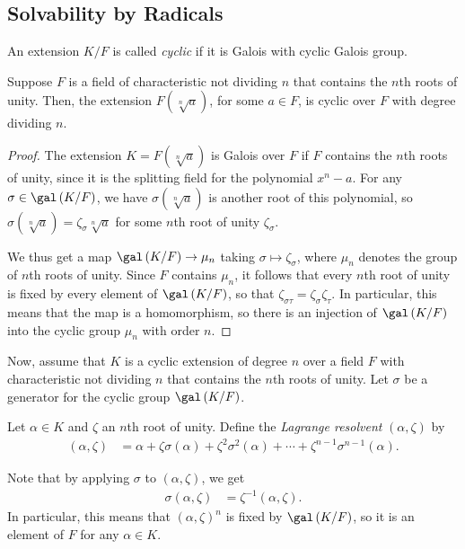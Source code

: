\documentclass[10pt]{mypackage}
\begin{document}
\subsection{Solvability by Radicals}%
\begin{definition}
  An extension $K/F$ is called \textit{cyclic} if it is Galois with cyclic Galois group.
\end{definition}
\begin{proposition}
  Suppose $F$ is a field of characteristic not dividing $n$ that contains the $n$th roots of unity. Then, the extension $F\left( \sqrt[n]{a} \right)$, for some $a\in F$, is cyclic over $F$ with degree dividing $n$.
\end{proposition}
\begin{proof}
  The extension $K = F\left( \sqrt[n]{a} \right)$ is Galois over $F$ if $F$ contains the $n$th roots of unity, since it is the splitting field for the polynomial $x^{n}-a$. For any $\sigma\in \gal\left( K/F \right)$, we have $\sigma\left( \sqrt[n]{a} \right)$ is another root of this polynomial, so $\sigma\left( \sqrt[n]{a} \right) = \zeta_{\sigma}\sqrt[n]{a}$ for some $n$th root of unity $\zeta_{\sigma}$.

  We thus get a map $\gal\left( K/F \right)\rightarrow \mu_n$ taking $\sigma\mapsto \zeta_{\sigma}$, where $\mu_n$ denotes the group of $n$th roots of unity. Since $F$ contains $\mu_n$, it follows that every $n$th root of unity is fixed by every element of $\gal\left( K/F \right)$, so that $\zeta_{\sigma\tau} = \zeta_{\sigma}\zeta_{\tau}$. In particular, this means that the map is a homomorphism, so there is an injection of $\gal\left( K/F \right)$ into the cyclic group $\mu_n$ with order $n$.
\end{proof}
Now, assume that $K$ is a cyclic extension of degree $n$ over a field $F$ with characteristic not dividing $n$ that contains the $n$th roots of unity. Let $\sigma$ be a generator for the cyclic group $\gal\left( K/F \right)$.
\begin{definition}
  Let $\alpha\in K$ and $\zeta$ an $n$th root of unity. Define the \textit{Lagrange resolvent} $\left( \alpha,\zeta \right)$ by
  \begin{align*}
    \left( \alpha,\zeta \right) &= \alpha + \zeta\sigma\left( \alpha \right) + \zeta^2\sigma^2\left( \alpha \right) + \cdots + \zeta^{n-1}\sigma^{n-1}\left( \alpha \right).
  \end{align*}
\end{definition}
Note that by applying $\sigma$ to $\left( \alpha,\zeta \right)$, we get
\begin{align*}
  \sigma\left( \alpha,\zeta \right) &= \zeta^{-1}\left( \alpha,\zeta \right).
\end{align*}
In particular, this means that $\left( \alpha,\zeta \right)^{n}$ is fixed by $\gal\left( K/F \right)$, so it is an element of $F$ for any $\alpha\in K$.
\end{document}
